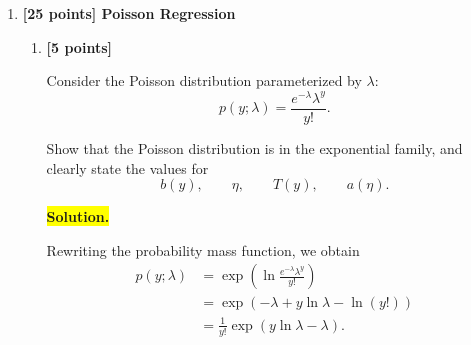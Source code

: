 \documentclass[10pt]{article}
\begin{document}
\begin{enumerate}
\begin{enumerate}[label=(\alph*)]
Plot $x_1$ on the horizontal axis and $x_2$ on the vertical axis, and
use two different symbols for the positive ($t^{(i)}=1$) and negative
($t^{(i)}=0$) examples.

In each plot, indicate the separating hyperplane with a red line.

\end{enumerate}

\medskip

\textit{Remark:}
We saw that the true probability $p(t\mid x)$ was only a constant
factor away from $p(y\mid x)$.

This means, if our task is to only rank examples (i.e.\ sort them) in
a particular order, then in fact we do not even need to estimate
$\alpha$.

The rank based on $p(y\mid x)$ will agree with the rank based on
$p(t\mid x)$.



\newpage


\item \textbf{[25 points] Poisson Regression}

\begin{enumerate}[label=(\alph*)]


\item \textbf{[5 points]}

Consider the Poisson distribution parameterized by $\lambda$:
\[
p(y;\lambda)
=
\frac{e^{-\lambda}\lambda^y}{y!}.
\]

Show that the Poisson distribution is in the exponential family, and
clearly state the values for
\[
b(y),\qquad
\eta,\qquad
T(y),\qquad
a(\eta).
\]


\medskip
\noindent\colorbox{yellow}{\textbf{Solution.}}
\vspace{3mm}

Rewriting the probability mass function, we obtain
\[
\begin{aligned}
p(y;\lambda)
&=\exp\left(
\ln\frac{e^{-\lambda}\lambda^y}{y!}
\right)\\
&=\exp\left(
-\lambda+y\ln\lambda-\ln(y!)
\right)\\
&=\frac{1}{y!}\exp\left(y\ln\lambda-\lambda\right).
\end{aligned}
\]


\end{enumerate}
\end{enumerate}
\end{document}
